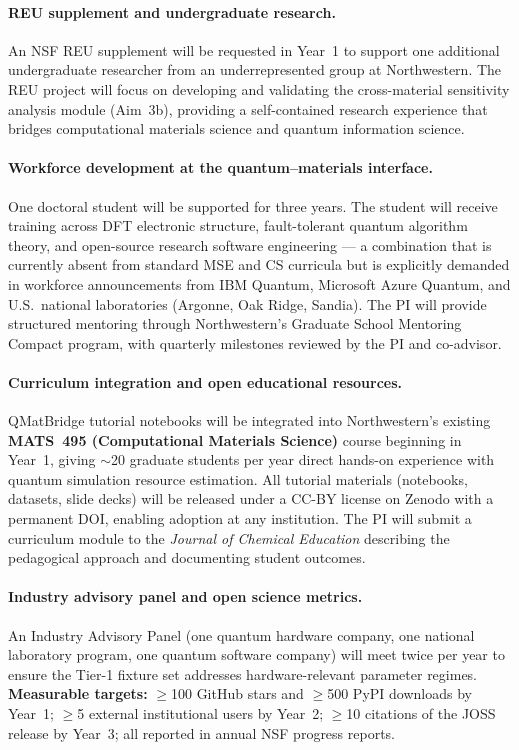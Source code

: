\documentclass[11pt]{article}
\begin{document}
\paragraph{REU supplement and undergraduate research.}
An NSF REU supplement will be requested in Year~1 to support one
additional undergraduate researcher from an underrepresented group at
Northwestern.
The REU project will focus on developing and validating the cross-material
sensitivity analysis module (Aim~3b), providing a self-contained
research experience that bridges computational materials science and
quantum information science.

\paragraph{Workforce development at the quantum--materials interface.}
One doctoral student will be supported for three years.
The student will receive training across DFT electronic structure,
fault-tolerant quantum algorithm theory, and open-source research
software engineering --- a combination that is currently absent from
standard MSE and CS curricula but is explicitly demanded in
workforce announcements from IBM Quantum, Microsoft Azure Quantum,
and U.S.\ national laboratories (Argonne, Oak Ridge, Sandia).
The PI will provide structured mentoring through Northwestern's
Graduate School Mentoring Compact program, with quarterly milestones
reviewed by the PI and co-advisor.

\paragraph{Curriculum integration and open educational resources.}
QMatBridge tutorial notebooks will be integrated into Northwestern's
existing \textbf{MATS~495 (Computational Materials Science)} course
beginning in Year~1, giving $\sim$20 graduate students per year
direct hands-on experience with quantum simulation resource estimation.
All tutorial materials (notebooks, datasets, slide decks) will be
released under a CC-BY license on Zenodo with a permanent DOI,
enabling adoption at any institution.
The PI will submit a curriculum module to the \emph{Journal of Chemical
Education} describing the pedagogical approach and documenting student
outcomes.

\paragraph{Industry advisory panel and open science metrics.}
An Industry Advisory Panel (one quantum hardware company, one national
laboratory program, one quantum software company) will meet twice per
year to ensure the Tier-1 fixture set addresses hardware-relevant
parameter regimes.
\textbf{Measurable targets:}
$\geq$100 GitHub stars and $\geq$500 PyPI downloads by Year~1;
$\geq$5 external institutional users by Year~2;
$\geq$10 citations of the JOSS release by Year~3;
all reported in annual NSF progress reports.
\end{document}
